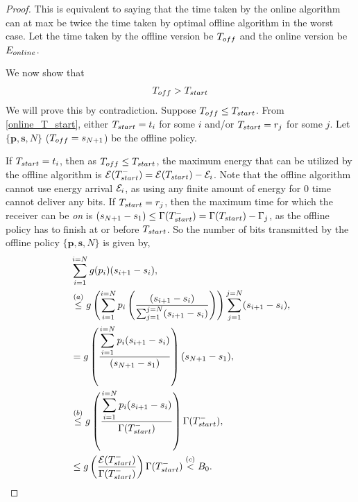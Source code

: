\begin{proof}
This is equivalent to saying that the time taken by the online algorithm can at max be twice the time taken by optimal offline algorithm in the worst case. Let the time taken by the offline version be $T_{\mbox{\scriptsize{off}}}$ and the online version be $E_{\mbox{\scriptsize{online}}}$. 

We now show that 
\begin{align}
T_{\mbox{\scriptsize{off}}} > T_{\mbox{\scriptsize{start}}}
\label{online_time}
\end{align}
We will prove this by contradiction. Suppose $T_{\mbox{\scriptsize{off}}}\le T_{\mbox{\scriptsize{start}}}$. From \eqref{online_T_start}, either $T_{\mbox{\scriptsize{start}}}=t_i$ for some $i$ and/or $T_{\mbox{\scriptsize{start}}}=r_j$ for some $j$. Let $\{\textbf{p},\textbf{s},N\}$ ($T_{\mbox{\scriptsize{off}}}=s_{N+1}$) be the offline policy.

If $T_{\mbox{\scriptsize{start}}}=t_i$, then as $T_{\mbox{\scriptsize{off}}}\le T_{\mbox{\scriptsize{start}}}$, the maximum energy that can be utilized by the offline algorithm is $\ETx(T_{\mbox{\scriptsize{start}}}^-)=\ETx(T_{\mbox{\scriptsize{start}}})-\ETx_i$. Note that the offline algorithm cannot use energy arrival $\mathcal{E}_i$, as using any finite amount of energy for 0 time cannot deliver any bits. If $T_{\mbox{\scriptsize{start}}}=r_j$, then the maximum time for which the receiver can be \textit{on} is $(s_{N+1}-s_1) \le\TRx(T_{\mbox{\scriptsize{start}}}^-)=\TRx(T_{\mbox{\scriptsize{start}}})-\TRx_j$, as the offline policy has to finish at or before $T_{\mbox{\scriptsize{start}}}$. 
So the number of bits transmitted by the offline policy $\{\textbf{p},\textbf{s},N\}$ is given by,
\begin{align}
&\sum_{i=1}^{i=N} g(p_i)(s_{i+1}-s_{i}),
\\
&\stackrel{(a)}{\le} g\left(\sum_{i=1}^{i=N}p_i\left(\frac{(s_{i+1}-s_{i})}{\sum_{j=1}^{j=N}(s_{i+1}-s_{i})}\right)\right) \sum_{j=1}^{j=N} (s_{i+1}-s_{i}),\label{online_eq_3}
\\
&=g\left(\frac{\displaystyle\sum_{i=1}^{i=N}p_i(s_{i+1}-s_{i})}{(s_{N+1}-s_{1})}\right)(s_{N+1}-s_{1}),\label{online_eq_4} 
\\
&\stackrel{(b)}{\le} g\left(\frac{\displaystyle\sum_{i=1}^{i=N}p_i(s_{i+1}-s_{i})}{\TRx(T_{\mbox{\scriptsize{start}}}^-)}\right)\TRx(T_{\mbox{\scriptsize{start}}}^-), \label{online_eq_1}
\\
&\le g\left(\frac{\ETx(T_{\mbox{\scriptsize{start}}}^-)}{\TRx(T_{\mbox{\scriptsize{start}}}^-)}\right)\TRx(T_{\mbox{\scriptsize{start}}}^-)\stackrel{(c)}{<}B_0.\label{online_eq_2}
\end{align}


\end{proof}
